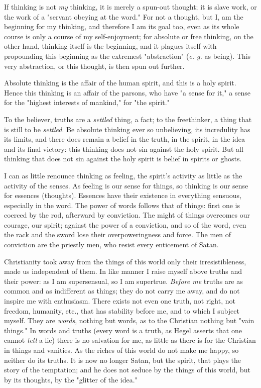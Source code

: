 \documentclass[a4paper]{book}
\begin{document}
If thinking is not \textit{my} thinking, it is merely a spun-out thought; it 
is slave work, or the work of a "{}servant obeying at the word."{} For not a 
thought, but I, am the beginning for my thinking, and therefore I am its goal 
too, even as its whole course is only a course of my self-enjoyment; for 
absolute or free thinking, on the other hand, thinking itself is the 
beginning, and it plagues itself with propounding this beginning as the 
extremest "{}abstraction"{} (\textit{e. g.} as being). This very abstraction, 
or this thought, is then spun out further.

Absolute thinking is the affair of the human spirit, and this is a holy 
spirit. Hence this thinking is an affair of the parsons, who have "{}a sense 
for it,"{} a sense for the "{}highest interests of mankind,"{} for "{}the 
spirit."{}

To the believer, truths are a \textit{settled} thing, a fact; to the 
freethinker, a thing that is still to be \textit{settled}. Be absolute 
thinking ever so unbelieving, its incredulity has its limits, and there does 
remain a belief in the truth, in the spirit, in the idea and its final 
victory: this thinking does not sin against the holy spirit. But all thinking 
that does not sin against the holy spirit is belief in spirits or ghosts.

I can as little renounce thinking as feeling, the spirit's activity as little 
as the activity of the senses. As feeling is our sense for things, so thinking 
is our sense for essences (thoughts). Essences have their existence in 
everything sensuous, especially in the word. The power of words follows that 
of things: first one is coerced by the rod, afterward by conviction. The might 
of things overcomes our courage, our spirit; against the power of a 
conviction, and so of the word, even the rack and the sword lose their 
overpoweringness and force. The men of conviction are the priestly men, who 
resist every enticement of Satan.

Christianity took away from the things of this world only their 
irresistibleness, made us independent of them. In like manner I raise myself 
above truths and their power: as I am supersensual, so I am supertrue. 
\textit{Before me} truths are as common and as indifferent as things; they do 
not carry me away, and do not inspire me with enthusiasm. There exists not 
even one truth, not right, not freedom, humanity, etc., that has stability 
before me, and to which I subject myself. They are \textit{words}, nothing but 
words, as to the Christian nothing but "{}vain things."{} In words and truths 
(every word is a truth, as Hegel asserts that one cannot \textit{tell} a lie) 
there is no salvation for me, as little as there is for the Christian in 
things and vanities. As the riches of this world do not make me happy, so 
neither do its truths. It is now no longer Satan, but the spirit, that plays 
the story of the temptation; and he does not seduce by the things of this 
world, but by its thoughts, by the "{}glitter of the idea."{}
\end{document}
